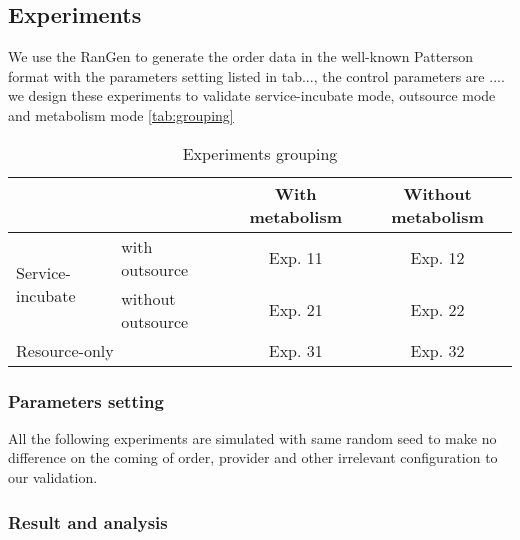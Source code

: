 \subsection{Experiments} %
\label{ssub:case_design}
We use the RanGen\cite{Demeulemeester2003,Vanhoucke2008} to generate the order data in the well-known Patterson format with the parameters setting listed in tab..., the control parameters are .... we design these experiments to validate service-incubate mode, outsource mode and metabolism mode \autoref{tab:grouping}

\begin{table}[htbp]
  \centering
  \scriptsize
  \caption{Experiments grouping}
    \begin{tabular}{llcc}
    \toprule
          &       & With metabolism & Without metabolism \\
    \midrule
    \multicolumn{1}{l}{\multirow{2}[0]{*}{Service-incubate}} & with outsource & Exp. 11 &Exp. 12 \\\cline{2-4}
    \multicolumn{1}{l}{} & without outsource & Exp. 21 & Exp. 22 \\\hline
    \multicolumn{2}{l}{Resource-only} & Exp. 31 & Exp. 32 \\
    \bottomrule
    \end{tabular}%
  \label{tab:grouping}%
\end{table}%



\subsubsection{Parameters setting} %
\label{ssub:parameters_setting}
All the following experiments are simulated with same random seed to make no difference on the coming of order, provider and other irrelevant configuration to our validation.

\subsubsection{Result and analysis} %
\label{ssub:result_and_analysis}

